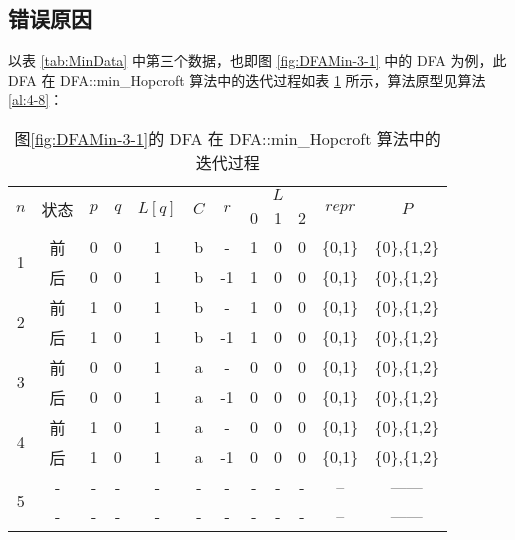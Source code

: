 \subsection{错误原因}\label{sec:reason-hopcroft}

以表 \ref{tab:MinData} 中第三个数据，也即图 \ref{fig:DFAMin-3-1} 中的 DFA 为例，此 DFA 在 DFA::min\_Hopcroft 算法中的迭代过程如表 \ref{tab:hopcroftAna} 所示，算法原型见算法 \ref{al:4-8}：

\begin{table}[!htbp]
    \caption{图\ref{fig:DFAMin-3-1}的 DFA 在 DFA::min\_Hopcroft 算法中的迭代过程}
    \label{tab:hopcroftAna}
    \centering
    \footnotesize%
    \setlength{\tabcolsep}{8pt}%
    \renewcommand{\arraystretch}{1.2}%
    \begin{tabular}{ccccccc|ccc|cc} 
        \toprule%
        \multirow{2}{*}{$n$} & \multirow{2}{*}{状态} & \multirow{2}{*}{$p$} & \multirow{2}{*}{$q$} & \multirow{2}{*}{$L[q]$} & \multirow{2}{*}{$C$} & \multirow{2}{*}{$r$} & \multicolumn{3}{c|}{$L$} & \multirow{2}{*}{$repr$} & \multirow{2}{*}{$P$}  \\
        \cline{8-10}             &                   &                     &                    &                       &                   &    & 0 & 1 &2 & & \\
        \midrule%
        \multirow{2}{*}{1} & 前 & 0 & 0 & 1 & b & -  & 1 & 0 & 0 & \{0,1\} & \{0\},\{1,2\} \\
                           & 后 & 0 & 0 & 1 & b & -1 & 1 & 0 & 0 & \{0,1\} & \{0\},\{1,2\} \\
        \midrule%
        \multirow{2}{*}{2} & 前 & 1 & 0 & 1 & b & -  & 1 & 0 & 0 & \{0,1\} & \{0\},\{1,2\} \\
                           & 后 & 1 & 0 & 1 & b & -1 & 1 & 0 & 0 & \{0,1\} & \{0\},\{1,2\} \\
        \midrule%
        \multirow{2}{*}{3} & 前 & 0 & 0 & 1 & a & -  & 0 & 0 & 0 & \{0,1\} & \{0\},\{1,2\} \\
                           & 后 & 0 & 0 & 1 & a & -1 & 0 & 0 & 0 & \{0,1\} & \{0\},\{1,2\} \\
        \midrule%
        \multirow{2}{*}{4} & 前 & 1 & 0 & 1 & a & -  & 0 & 0 & 0 & \{0,1\} & \{0\},\{1,2\} \\
                           & 后 & 1 & 0 & 1 & a & -1 & 0 & 0 & 0 & \{0,1\} & \{0\},\{1,2\} \\
        \midrule%
        \multirow{2}{*}{5} & - & - & - & - & - & -  & - & - & - & -- & ------ \\
                           & - & - & - & - & - & -  & - & - & - & -- & ------ \\
        \bottomrule%
    \end{tabular}
\end{table}

